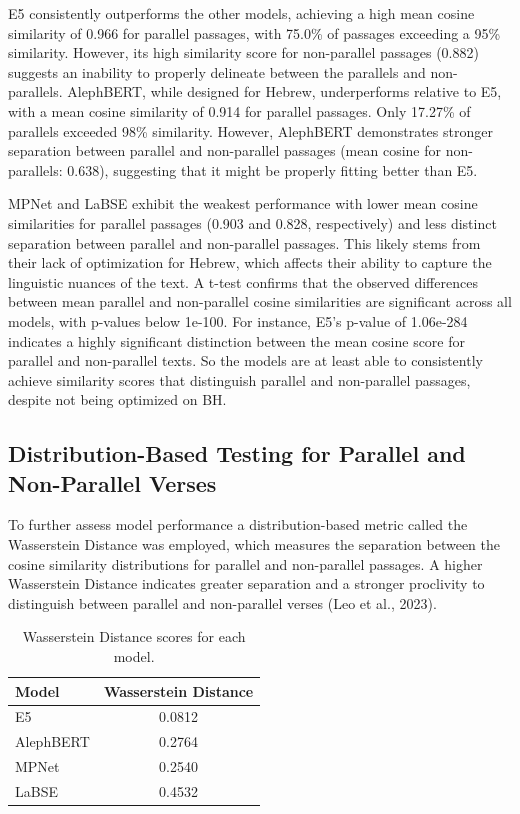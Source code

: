 \documentclass[12pt]{article}
\begin{document}
E5 consistently outperforms the other models, achieving a high mean cosine similarity of 0.966 for parallel passages, with 75.0\% of passages exceeding a 95\% similarity. However, its high similarity score for non-parallel passages (0.882) suggests an inability to properly delineate between the parallels and non-parallels. AlephBERT, while designed for Hebrew, underperforms relative to E5, with a mean cosine similarity of 0.914 for parallel passages. Only 17.27\% of parallels exceeded 98\% similarity. However, AlephBERT demonstrates stronger separation between parallel and non-parallel passages (mean cosine for non-parallels: 0.638), suggesting that it might be properly fitting better than E5.

MPNet and LaBSE exhibit the weakest performance with lower mean cosine similarities for parallel passages (0.903 and 0.828, respectively) and less distinct separation between parallel and non-parallel passages. This likely stems from their lack of optimization for Hebrew, which affects their ability to capture the linguistic nuances of the text.
A t-test confirms that the observed differences between mean parallel and non-parallel cosine similarities are significant across all models, with p-values below 1e-100. For instance, E5’s p-value of 1.06e-284 indicates a highly significant distinction between the mean cosine score for parallel and non-parallel texts. So the models are at least able to consistently achieve similarity scores that distinguish parallel and non-parallel passages, despite not being optimized on BH.

\subsection{Distribution-Based Testing for Parallel and Non-Parallel Verses}
To further assess model performance a distribution-based metric called the Wasserstein Distance was employed, which measures the separation between the cosine similarity distributions for parallel and non-parallel passages. A higher Wasserstein Distance indicates greater separation and a stronger proclivity to distinguish between parallel and non-parallel verses (Leo et al., 2023). 
\begin{table}[htbp]
\centering
\label{tab:wasserstein}
\begin{tabular}{@{}lc@{}}
\toprule
\textbf{Model} & \textbf{Wasserstein Distance} \\ 
\midrule
E5         & 0.0812 \\
AlephBERT  & 0.2764 \\
MPNet      & 0.2540 \\
LaBSE      & 0.4532 \\
\bottomrule
\end{tabular}
\caption{Wasserstein Distance scores for each model.}
\end{table}
\end{document}
